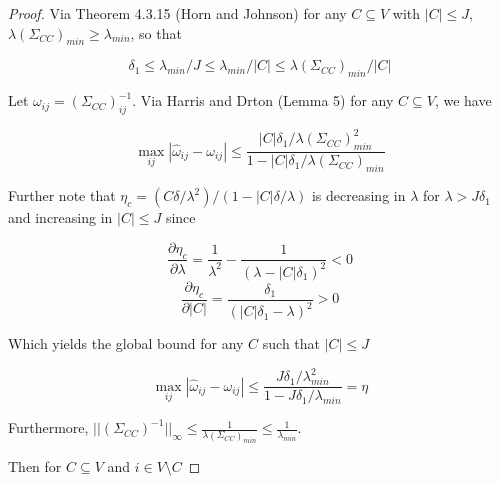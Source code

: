 \documentclass[]{article}
\begin{document}
\begin{proof}

Via Theorem 4.3.15 (Horn and Johnson) for any $C \subseteq V$ with $|C| \leq J$, $\lambda(\Sigma_{CC})_{min} \geq \lambda_{min}$, so that

\[\delta_1 \leq \lambda_{min}/J \leq  \lambda_{min}/|C| \leq \lambda(\Sigma_{CC})_{min}/|C|\]

Let $\omega_{ij} = (\Sigma_{CC})^{-1}_{ij}$. Via Harris and Drton (Lemma 5) for any $C \subseteq V$, we have

\begin{equation}
\max_{ij}|\hat \omega_{ij} - \omega_{ij}| \leq \frac{|C|\delta_1 / \lambda(\Sigma_{CC})^2_{min}}{1 - |C|\delta_1 / \lambda(\Sigma_{CC})_{min} }
\end{equation}

Further note that $\eta_c = (C \delta/ \lambda^2) / (1 - |C| \delta / \lambda)$ is decreasing in $\lambda$ for $\lambda > J \delta_1$ and increasing in $|C| \leq J$ since

\begin{equation}
\frac{\partial \eta_c}{\partial \lambda} = \frac{1}{\lambda^2} - \frac{1}{(\lambda - |C| \delta_1)^2} < 0
\end{equation}
\begin{equation}
\frac{\partial \eta_c}{\partial |C|} = \frac{\delta_1}{(|C|\delta_1-\lambda)^2} > 0
\end{equation}

Which yields the global bound for any $C$ such that $|C| \leq J$

\begin{equation}
\max_{ij}|\hat \omega_{ij} - \omega_{ij}| \leq \frac{J\delta_1 / \lambda^2_{min}}{1 - J\delta_1 / \lambda_{min} } = \eta
\end{equation}


Furthermore, $||(\Sigma_{CC})^{-1}||_\infty \leq \frac{1}{\lambda(\Sigma_{CC})_{min}} \leq \frac{1}{\lambda_{min}}$.

Then for $C \subseteq V$ and $i \in V\setminus C$


\end{proof}
\end{document}
